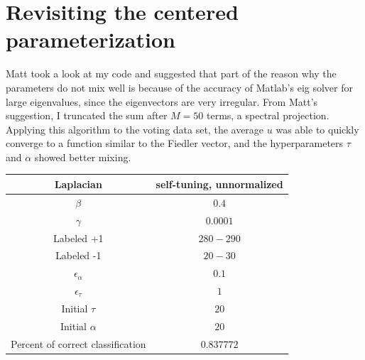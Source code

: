 \documentclass{siamart1116}
\begin{document}
\section{Revisiting the centered parameterization}
Matt took a look at my code and suggested that part of the reason why the parameters do not mix well is because of the accuracy of Matlab's eig solver for large eigenvalues, since the eigenvectors are very irregular. From Matt's suggestion, I truncated the sum after $M=50$ terms, a spectral projection. Applying this algorithm to the voting data set, the average $u$ was able to quickly converge to a function similar to the Fiedler vector, and the hyperparameters $\tau$ and $\alpha$ showed better mixing.
\begin{center}
\begin{tabular}{| c | c |}
\hline
Laplacian & self-tuning, unnormalized \\ \hline
$\beta$ & $0.4$\\ \hline
$\gamma$ & $0.0001$\\ \hline
Labeled +1 & $280-290$ \\ \hline
Labeled -1 & $20-30$ \\ \hline
$\epsilon_\alpha$ & $0.1$\\ \hline
$\epsilon_\tau$ & $1$\\ \hline
Initial $\tau$ & $20$\\ \hline
Initial $\alpha$ & $20$\\ \hline
Percent of correct classification & $0.837772$ \\ \hline
\end{tabular}
\end{center}
\end{document}
